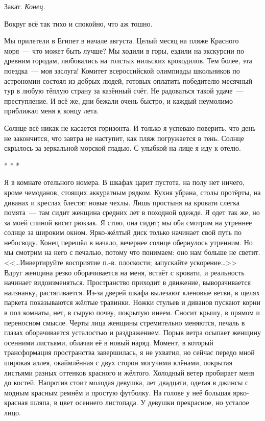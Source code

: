 \documentclass[openany, oneside]{book}
\begin{document}
Закат. \textit{Конец.}

Вокруг всё так тихо и спокойно, что аж тошно.

Мы прилетели в Египет в начале августа. Целый месяц на пляже Красного моря~--- что может быть лучше? Мы ходили в горы, ездили на экскурсии по древним городам, любовались на толстых нильских крокодилов. Тем более, эта поездка~--- моя заслуга! Комитет всероссийской олимпиады школьников по астрономии состоял из добрых людей, готовых оплатить победителю месячный тур в любую тёплую страну за казённый счёт. Не радоваться такой удаче~--- преступление. И всё же, дни бежали очень быстро, и каждый неумолимо приближал меня к концу лета.

Солнце всё никак не касается горизонта. И только я успеваю поверить, что день не закончится, что завтра не наступит, как пляж погружается в тень. Солнце скрылось за зеркальной морской гладью. С улыбкой на лице я иду к отелю.

\begin{center}
    * * * 
\end{center}

Я в комнате отельного номера. В шкафах царит пустота, на полу нет ничего, кроме чемоданов, стоящих аккуратным рядком. Кухня убрана, столы протёрты, на диванах и креслах блестят новые чехлы. Лишь простыня на кровати слегка помята~--- там сидит женщина средних лет в походной одежде. Я одет так же, но за моей спиной висит рюкзак. Я стою, она сидит; мы оба смотрим на утреннее солнце за широким окном. Ярко-жёлтый диск только начинает свой путь по небосводу. Конец перешёл в начало, вечернее солнце обернулось утренним. Но мы смотрим на него с печалью, потому что понимаем: оно нам больше не светит.\\

<<\dots Инвертируйте восприятие п.-в. плоскости; запускайте ускорение\dots>>\\

Вдруг женщина резко оборачивается на меня, встаёт с кровати, и реальность начинает видоизменяться. Пространство приходит в движение, выворачивается наизнанку, растягивается. Из-за дверей шкафа вылезают кленовые ветви, в щелях паркета показываются жёлтые травинки. Ножки стульев и диванов пускают корни в пол комнаты, нет, в сырую почву, покрытую инеем. Сносит крышу, в прямом и переносном смысле. Черты лица женщины стремительно меняются, печаль в глазах оборачивается усталостью и раздражением. Порыв ветра осыпает женщину осенними листьями, облачая её в новый наряд. Момент, в который трансформация пространства завершилась, я не ухватил, но сейчас передо мной широкая аллея, окаймлённая с двух сторон могучими клёнами, покрытая листьями разных оттенков красного и жёлтого. Холодный ветер пробирает меня до костей. Напротив стоит молодая девушка, лет двадцати, одетая в джинсы с модным красным ремнём и простую футболку. На голове у неё большая ярко-красная шляпа, в цвет осеннего листопада. У девушки прекрасное, но усталое лицо.
\end{document}
